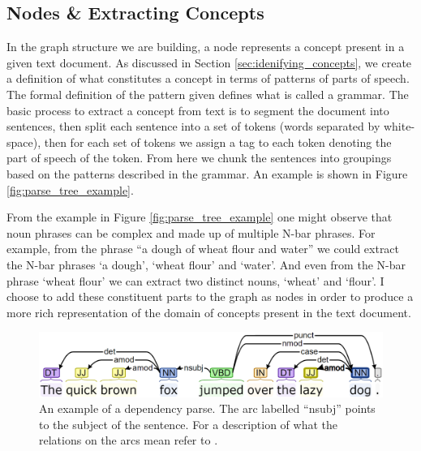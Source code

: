 \documentclass[12pt]{article}
\theoremstyle{grammarstyle}
\begin{document}
\subsection{Nodes \& Extracting Concepts}
In the graph structure we are building, a node represents a concept present in a given text document. As discussed in Section \ref{sec:idenifying_concepts}, we create a definition of what constitutes a concept in terms of patterns of parts of speech. The formal definition of the pattern given defines what is called a grammar. The basic process to extract a concept from text is to segment the document into sentences, then split each sentence into a set of tokens (words separated by white-space), then for each set of tokens we assign a tag to each token denoting the part of speech of the token. From here we chunk the sentences into groupings based on the patterns described in the grammar. An example is shown in Figure \ref{fig:parse_tree_example}.

From the example in Figure \ref{fig:parse_tree_example} one might observe that noun phrases can be complex and made up of multiple N-bar phrases. For example, from the phrase ``a dough of wheat flour and water'' we could extract the N-bar phrases `a dough', `wheat flour' and `water'. And even from the N-bar phrase `wheat flour' we can extract two distinct nouns, `wheat' and `flour'. I choose to add these constituent parts to the graph as nodes in order to produce a more rich representation of the domain of concepts present in the text document.

\begin{figure}
    \centering
    \includegraphics[width=\linewidth]{reports/technical_report/latex/figures/dependency_parse.png}
    \caption{An example of a dependency parse. The arc labelled ``nsubj'' points to the subject of the sentence.
    For a description of what the relations on the arcs mean refer to \citep{martin2018speech}.\protect\footnotemark}
    \label{fig:dependency_parse_example}
\end{figure}

\end{document}

